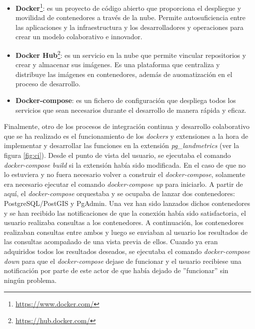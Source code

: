 \begin{itemize}
\item\textbf{Docker}\footnote{\url{https://www.docker.com/}}: es un proyecto de código abierto que proporciona el despliegue y movilidad de contenedores a través de la nube. Permite autosuficiencia entre las aplicaciones y la infraestructura y los desarrolladores y operaciones para crear un modelo colaborativo e innovador.
\item\textbf{Docker Hub}\footnote{\url{https://hub.docker.com/}}: es un servicio en la nube que permite vincular repositorios y crear y almacenar sus imágenes. Es una plataforma que centraliza y distribuye las imágenes en contenedores, además de auomatización en el proceso de desarrollo.
\item\textbf{Docker-compose}: es un fichero de configuración que despliega todos los servicios que sean necesarios durante el desarrollo de manera rápida y eficaz.
\end{itemize}

Finalmente, otro de los procesos de integración continua y desarrollo colaborativo que se ha realizado es el funcionamiento de los \textit{dockers} y extensiones a la hora de implementar y desarrollar las funciones en la extensión \textit{pg\_landmetrics} (ver la figura \ref{fig:ci}). Desde el punto de vista del usuario, se ejecutaba el comando \textit{docker-compose build} si la extensión había sido modificada. En el caso de que no lo estuviera y no fuera necesario volver a construir el \textit{docker-compose}, solamente era necesario ejecutar el comando \textit{docker-compose up} para iniciarlo. A partir de aquí, el \textit{docker-compose} orquestaba y se ocupaba de lanzar dos contenedores: PostgreSQL/PostGIS y PgAdmin. Una vez han sido lanzados dichos contenedores y se han recibido las notificaciones de que la conexión había sido satisfactoria, el usuario realizaba consultas a los contenedores. A continuación, los contenedores realizaban consultas entre ambos y luego se enviaban al usuario los resultados de las consultas acompañado de una vista previa de ellos. Cuando ya eran adquiridos todos los resultados deseados, se ejecutaba el comando \textit{docker-compose down} para que el \textit{docker-compose} dejase de funcionar y el usuario recibiese una notificación por parte de este actor de que había dejado de ''funcionar'' sin ningún problema.

